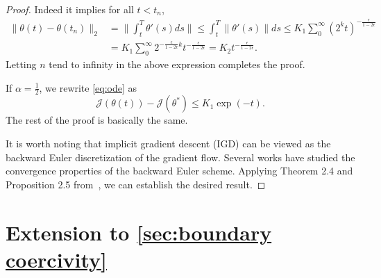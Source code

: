 \documentclass{article}
\begin{document}
\begin{proof}
    Indeed it implies for all $t<t_{n}$, 
    \begin{equation*}
        \begin{aligned}
             \|\theta(t)-\theta(t_{n})\|_{2}&=\|\int_t^T \theta'(s) ds\|\le \int_t^T \|\theta'(s)\| ds \le K_1 \sum_{0}^{\infty} (2^k t)^{-\frac{\epsilon}{1-2\epsilon}} \\
             &= K_1 \sum_{0}^{\infty} 2^{-\frac{\epsilon}{1-2\epsilon} k} t^{-\frac{\epsilon}{1-2\epsilon}} = K_2 t^{-\frac{\epsilon}{1-2\epsilon}} .
        \end{aligned}
    \end{equation*} 
    Letting $n$ tend to infinity in the above expression completes the proof.
    
    If $\alpha = \frac{1}{2}$, we rewrite \cref{eq:ode} as
    \begin{equation*}
        \mathcal{J}(\theta(t))-\mathcal{J}(\theta^*) \le K_1 \exp(-t) .
    \end{equation*}
    The rest of the proof is basically the same.

    It is worth noting that implicit gradient descent (IGD) can be viewed as the backward Euler discretization of the gradient flow. 
    Several works have studied the convergence properties of the backward Euler scheme. 
    Applying Theorem 2.4 and Proposition 2.5 from~\cite{merlet2010convergence}, we can establish the desired result. 
\end{proof}

\section{Extension to \texorpdfstring{\cref{sec:boundary coercivity}}{Section \ref{sec:boundary coercivity}}}
\end{document}
